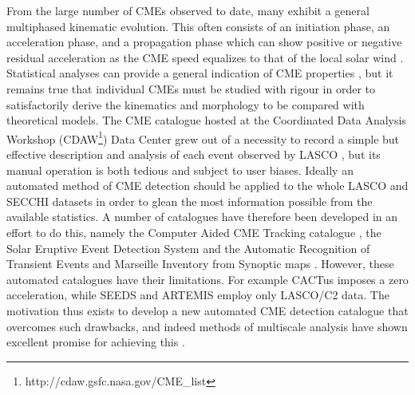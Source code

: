 \documentclass[preprint2]{aastex}
\begin{document}
From the large number of CMEs observed to date, many exhibit a general multiphased kinematic evolution. This often consists of an initiation phase, an acceleration phase, and a propagation phase which can show positive or negative residual acceleration as the CME speed equalizes to that of the local solar wind \citep{2006ApJ...649.1100Z, 2009SoPh..256..149M}. Statistical analyses can provide a general indication of CME properties \citep[e.g.][]{2000GeoRL..27..145G, 2003AdSpR..32.2637D, 2005AnGeo..23.1033S}, but it remains true that individual CMEs must be studied with rigour in order to satisfactorily derive the kinematics and morphology to be compared with theoretical models. The CME catalogue hosted at the Coordinated Data Analysis Workshop (CDAW\footnote{http://cdaw.gsfc.nasa.gov/CME\_list}) Data Center grew out of a necessity to record a simple but effective description and analysis of each event observed by LASCO \citep{2009EM&P..104..295G}, but its manual operation is both tedious and subject to user biases. Ideally an automated method of CME detection should be applied to the whole LASCO and SECCHI datasets in order to glean the most information possible from the available statistics. A number of catalogues have therefore been developed in an effort to do this, namely the Computer Aided CME Tracking catalogue \citep[CACTus\footnote{http://sidc.oma.be/cactus/};][]{2004A&A...425.1097R}, the Solar Eruptive Event Detection System \citep[SEEDS\footnote{http://spaceweather.gmu.edu/seeds/};][]{2008SoPh..248..485O} and the Automatic Recognition of Transient Events and Marseille Inventory from Synoptic maps \citep[ARTEMIS\footnote{http://www.oamp.fr/lasco/};][]{2009SoPh..257..125B}. However, these automated catalogues have their limitations. For example CACTus imposes a zero acceleration, while SEEDS and ARTEMIS employ only LASCO/C2 data. The motivation thus exists to develop a new automated CME detection catalogue that overcomes such drawbacks, and indeed methods of multiscale analysis have shown excellent promise for achieving this \citep{2009A&A...495..325B}.
\end{document}
